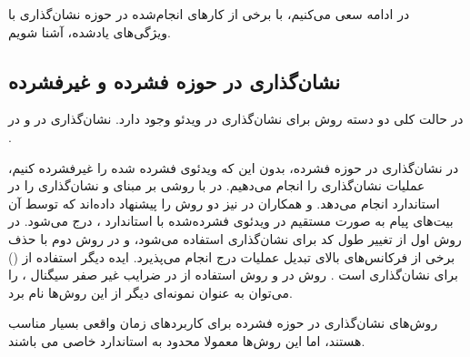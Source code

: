 در ادامه سعی می‌کنیم، با برخی از کارهای انجام‌شده در حوزه نشان‌گذاری با ویژگی‌های یادشده، آشنا شویم. 


\subsection{نشان‌گذاری در حوزه فشرده و غیرفشرده }
در حالت کلی دو دسته روش برای نشان‌گذاری در ویدئو وجود دارد. نشان‌گذاری در  {} \cite{Belhaj2010,Xu2010a,Zhang2010a,Langelaar1998,Bavipati2010} و در {} {\cite{Lancini2002,Chan2003,Deguillaume1999}}. 

در نشان‌گذاری در حوزه فشرده، بدون این که ویدئوی فشرده شده را غیرفشرده کنیم، عملیات نشان‌گذاری را انجام می‌دهیم. 
{} در \cite{Belhaj2010} با روشی بر مبنای  و {} نشان‌گذاری را در استاندارد  انجام می‌دهد. {} و همکاران در {\cite{Langelaar1998}} نیز دو روش را پیشنهاد داده‌اند که توسط آن بیت‌های پیام به صورت مستقیم در ویدئوی فشرده‌شده با استاندارد {}، درج می‌شود. در روش اول از تغییر طول کد برای نشان‌گذاری استفاده می‌شود، و در روش دوم با حذف برخی از فرکانس‌های بالای تبدیل {} عملیات درج انجام می‌پذیرد. ایده دیگر استفاده از {} () برای نشان‌گذاری است \cite{Zhang2001,Kung2003}. 
روش  در \cite{Meng1996} و روش استفاده از  در ضرایب غیر صفر  سیگنال {\cite{Hartung1998}}،  را می‌توان به عنوان نمونه‌ای دیگر از این روش‌ها نام برد. 

روش‌های نشان‌گذاری در حوزه فشرده برای کاربردهای زمان واقعی بسیار مناسب هستند، اما این روش‌ها معمولا محدود به استاندارد خاصی می باشند. 

